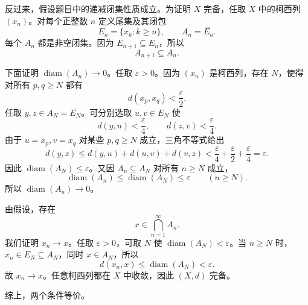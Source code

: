 \documentclass{article}
\begin{document}
反过来，假设题目中的递减闭集性质成立。为证明 $X$ 完备，任取 $X$ 中的柯西列 $(x_n)$。对每个正整数 $n$ 定义尾集及其闭包
\[
  E_n=\{x_k:k\ge n\},
  \qquad
  A_n=\overline{E_n}.
\]
每个 $A_n$ 都是非空闭集。因为 $E_{n+1}\subseteq E_n$，所以
\[
  A_{n+1}\subseteq A_n.
\]

下面证明 $\operatorname{diam}(A_n)\to0$。任取 $\varepsilon>0$。因为 $(x_n)$ 是柯西列，存在 $N$，使得对所有 $p,q\ge N$ 都有
\[
  d(x_p,x_q)<\frac{\varepsilon}{2}.
\]
任取 $y,z\in A_N=\overline{E_N}$。可分别选取 $u,v\in E_N$ 使
\[
  d(y,u)<\frac{\varepsilon}{4},
  \qquad
  d(z,v)<\frac{\varepsilon}{4}.
\]
由于 $u=x_p,v=x_q$ 对某些 $p,q\ge N$ 成立，三角不等式给出
\[
  d(y,z)
  \le d(y,u)+d(u,v)+d(v,z)
  <\frac{\varepsilon}{4}+\frac{\varepsilon}{2}+\frac{\varepsilon}{4}
  =\varepsilon.
\]
因此 $\operatorname{diam}(A_N)\le\varepsilon$。又因 $A_n\subseteq A_N$ 对所有 $n\ge N$ 成立，
\[
  \operatorname{diam}(A_n)\le\operatorname{diam}(A_N)\le\varepsilon
  \qquad(n\ge N).
\]
所以 $\operatorname{diam}(A_n)\to0$。

由假设，存在
\[
  x\in\bigcap_{n=1}^{\infty}A_n.
\]
我们证明 $x_n\to x$。任取 $\varepsilon>0$，可取 $N$ 使 $\operatorname{diam}(A_N)<\varepsilon$。当 $n\ge N$ 时，$x_n\in E_N\subseteq A_N$，同时 $x\in A_N$，所以
\[
  d(x_n,x)\le\operatorname{diam}(A_N)<\varepsilon.
\]
故 $x_n\to x$。任意柯西列都在 $X$ 中收敛，因此 $(X,d)$ 完备。

综上，两个条件等价。
\end{document}
